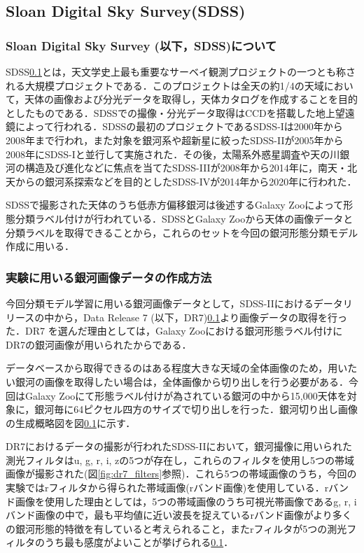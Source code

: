 \documentclass[a4j, 11pt]{jarticle}
\begin{document}
\subsection{Sloan Digital Sky Survey(SDSS)}
\subsubsection*{Sloan Digital Sky Survey (以下，SDSS)について}
SDSS\ref{}とは，天文学史上最も重要なサーベイ観測プロジェクトの一つとも称される大規模プロジェクトである．このプロジェクトは全天の約1/4の天域において，天体の画像および分光データを取得し，天体カタログを作成することを目的としたものである．SDSSでの撮像・分光データ取得はCCDを搭載した地上望遠鏡によって行われる．SDSSの最初のプロジェクトであるSDSS-Iは2000年から2008年まで行われ，また対象を銀河系や超新星に絞ったSDSS-IIが2005年から2008年にSDSS-Iと並行して実施された．その後，太陽系外惑星調査や天の川銀河の構造及び進化などに焦点を当てたSDSS-IIIが2008年から2014年に，南天・北天からの銀河系探索などを目的としたSDSS-IVが2014年から2020年に行われた．

SDSSで撮影された天体のうち低赤方偏移銀河は後述するGalaxy Zooによって形態分類ラベル付けが行われている．SDSSとGalaxy Zooから天体の画像データと分類ラベルを取得できることから，これらのセットを今回の銀河形態分類モデル作成に用いる．
\subsubsection*{実験に用いる銀河画像データの作成方法}
今回分類モデル学習に用いる銀河画像データとして，SDSS-IIにおけるデータリリースの中から，Data Release 7 (以下，DR7)\ref{}より画像データの取得を行った．DR7 を選んだ理由としては，Galaxy Zooにおける銀河形態ラベル付けにDR7の銀河画像が用いられたからである．

データベースから取得できるのはある程度大きな天域の全体画像のため，用いたい銀河の画像を取得したい場合は，全体画像から切り出しを行う必要がある．今回はGalaxy Zooにて形態ラベル付けが為されている銀河の中から15,000天体を対象に，銀河毎に64ピクセル四方のサイズで切り出しを行った．銀河切り出し画像の生成概略図を図\ref{}に示す．

DR7におけるデータの撮影が行われたSDSS-IIにおいて，銀河撮像に用いられた測光フィルタはu, g, r, i, zの5つが存在し，これらのフィルタを使用し5つの帯域画像が撮影された(図\ref{fig:dr7_filters}参照)．これら5つの帯域画像のうち，今回の実験ではrフィルタから得られた帯域画像(rバンド画像)を使用している．rバンド画像を使用した理由としては，5つの帯域画像のうち可視光帯画像であるg, r, iバンド画像の中で，最も平均値に近い波長を捉えているrバンド画像がより多くの銀河形態的特徴を有していると考えられること，またrフィルタが5つの測光フィルタのうち最も感度がよいことが挙げられる\ref{}．
\end{document}
